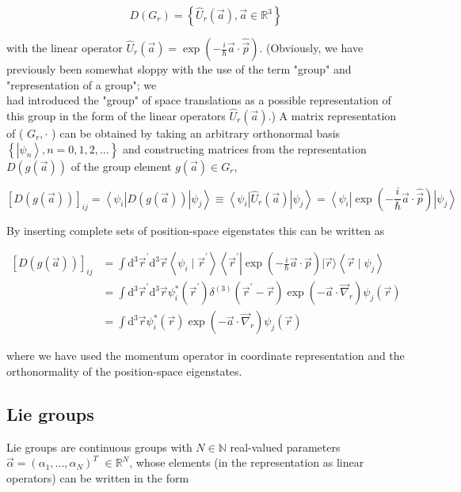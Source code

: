 \documentclass[10pt, letterpaper]{article}
\begin{document}
$$
D\left(G_{r}\right)=\left\{\hat{U}_{r}(\vec{a}), \vec{a} \in \mathbb{R}^{3}\right\}
$$

with the linear operator $\hat{U}_{r}(\vec{a})=\exp \left(-\frac{i}{\hbar} \vec{a} \cdot \hat{\vec{p}}\right)$. (Obviously, we have previously been somewhat sloppy with the use of the term "group" and "representation of a group"; we\\
had introduced the "group" of space translations as a possible representation of this group in the form of the linear operators $\hat{U}_{r}(\vec{a})$.) A matrix representation of ( $G_{r}, \cdot$ ) can be obtained by taking an arbitrary orthonormal basis $\left\{\left|\psi_{n}\right\rangle, n=0,1,2, \ldots\right\}$ and constructing matrices from the representation $D(g(\vec{a}))$ of the group element $g(\vec{a}) \in G_{r}$,

$$
[D(g(\vec{a}))]_{i j}=\left\langle\psi_{i}\right| D(g(\vec{a}))\left|\psi_{j}\right\rangle \equiv\left\langle\psi_{i}\right| \hat{U}_{r}(\vec{a})\left|\psi_{j}\right\rangle=\left\langle\psi_{i}\right| \exp \left(-\frac{i}{\hbar} \vec{a} \cdot \hat{\vec{p}}\right)\left|\psi_{j}\right\rangle
$$

By inserting complete sets of position-space eigenstates this can be written as

$$
\begin{aligned}
{[D(g(\vec{a}))]_{i j} } & =\int \mathrm{d}^{3} \vec{r}^{\prime} \mathrm{d}^{3} \vec{r}\left\langle\psi_{i} \mid \vec{r}^{\prime}\right\rangle\left\langle\vec{r}^{\prime}\right| \exp \left(-\frac{i}{\hbar} \vec{a} \cdot \hat{\vec{p}}\right)|\vec{r}\rangle\left\langle\vec{r} \mid \psi_{j}\right\rangle \\
& =\int \mathrm{d}^{3} \vec{r}^{\prime} \mathrm{d}^{3} \vec{r} \psi_{i}^{*}\left(\vec{r}^{\prime}\right) \delta^{(3)}\left(\vec{r}^{\prime}-\vec{r}\right) \exp \left(-\vec{a} \cdot \vec{\nabla}_{r}\right) \psi_{j}(\vec{r}) \\
& =\int \mathrm{d}^{3} \vec{r} \psi_{i}^{*}(\vec{r}) \exp \left(-\vec{a} \cdot \vec{\nabla}_{r}\right) \psi_{j}(\vec{r})
\end{aligned}
$$

where we have used the momentum operator in coordinate representation and the orthonormality of the position-space eigenstates.

\subsection{Lie groups}
Lie groups are continuous groups with $N \in \mathbb{N}$ real-valued parameters $\vec{\alpha}=\left(\alpha_{1}, \ldots, \alpha_{N}\right)^{T}$ $\in \mathbb{R}^{N}$, whose elements (in the representation as linear operators) can be written in the form
\end{document}
